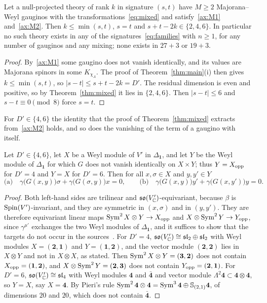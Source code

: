 \begin{corollary}
\label{cor:mixed}
Let a null-projected theory of rank $k$ in signature $(s,t)$ have $M\ge2$ Majorana--Weyl gauginos with the transformations~\eqref{eq:mixed} and satisfy~\ref{ax:M1} and~\ref{ax:M2}. Then $k\le\min(s,t)$, $s=t$ and $s+t-2k\in\{2,4,6\}$. In particular no such theory exists in any of the signatures~\eqref{eq:families} with $n\ge1$, for any number of gauginos and any mixing; none exists in $27+3$ or $19+3$.
\end{corollary}

\begin{proof}
By~\ref{ax:M1} some gaugino does not vanish identically, and its values are Majorana spinors in some $K_{\chi_A}$. The proof of Theorem~\ref{thm:main}(i) then gives $k\le\min(s,t)$, so $|s-t|\le s+t-2k=D'$. The residual dimension is even and positive, so by Theorem~\ref{thm:mixed} it lies in $\{2,4,6\}$. Then $|s-t|\le6$ and $s-t\equiv0\pmod8$ force $s=t$.
\end{proof}

For $D'\in\{4,6\}$ the identity that the proof of Theorem~\ref{thm:mixed} extracts from~\ref{ax:M2} holds, and so does the vanishing of the term of a gaugino with itself.

\begin{lemma}
\label{lem:fourandsix}
Let $D'\in\{4,6\}$, let $X$ be a Weyl module of $V'$ in $\Delta_{\mathbf 1}$, and let $Y$ be the Weyl module of $\Delta_{\mathbf 1}$ for which $G$ does not vanish identically on $X\times Y$; thus $Y=X_{\rm opp}$ for $D'=4$ and $Y=X$ for $D'=6$. Then for all $x,\sigma\in X$ and $y,y'\in Y$
\[
\text{(a)}\quad\gamma\bigl(G(x,y)\bigr)\sigma+\gamma\bigl(G(\sigma,y)\bigr)x=0,\qquad\text{(b)}\quad\gamma\bigl(G(x,y)\bigr)y'+\gamma\bigl(G(x,y')\bigr)y=0 .
\]
\end{lemma}

\begin{proof}
Both left-hand sides are trilinear and $\mathfrak{so}(V'_{\mathbb{C}})$-equivariant, because $\beta$ is $\operatorname{Spin}(V')$-invariant, and they are symmetric in $(x,\sigma)$ and in $(y,y')$. They are therefore equivariant linear maps $\operatorname{Sym}^2X\otimes Y\to X_{\rm opp}$ and $X\otimes\operatorname{Sym}^2Y\to Y_{\rm opp}$, since $\gamma^{\mu'}$ exchanges the two Weyl modules of $\Delta_{\mathbf 1}$, and it suffices to show that the targets do not occur in the sources~\cite{FultonHarris1991}. For $D'=4$, $\mathfrak{so}(V'_{\mathbb{C}})\cong\mathfrak{sl}_2\oplus\mathfrak{sl}_2$ with Weyl modules $X=(\mathbf 2,\mathbf 1)$ and $Y=(\mathbf 1,\mathbf 2)$, and the vector module $(\mathbf 2,\mathbf 2)$ lies in $X\otimes Y$ and not in $X\otimes X$, as stated. Then $\operatorname{Sym}^2X\otimes Y=(\mathbf 3,\mathbf 2)$ does not contain $X_{\rm opp}=(\mathbf 1,\mathbf 2)$, and $X\otimes\operatorname{Sym}^2Y=(\mathbf 2,\mathbf 3)$ does not contain $Y_{\rm opp}=(\mathbf 2,\mathbf 1)$. For $D'=6$, $\mathfrak{so}(V'_{\mathbb{C}})\cong\mathfrak{sl}_4$ with Weyl modules $\mathbf 4$ and $\bar{\mathbf 4}$ and vector module $\Lambda^2\mathbf 4\subset\mathbf 4\otimes\mathbf 4$, so $Y=X$, say $X=\mathbf 4$. By Pieri's rule $\operatorname{Sym}^2\mathbf 4\otimes\mathbf 4=\operatorname{Sym}^3\mathbf 4\oplus\mathbb S_{(2,1)}\mathbf 4$, of dimensions $20$ and $20$, which does not contain $\bar{\mathbf 4}$.
\end{proof}


